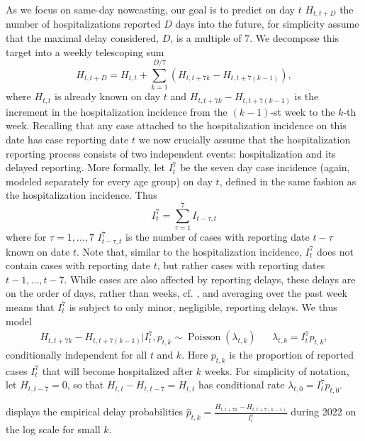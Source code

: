 As we focus on same-day nowcasting, our goal is to predict on day $t$ $H^{}_{t, t + D}$ the number of hospitalizations reported $D$ days into the future, for simplicity assume that the maximal delay considered, $D$, is a multiple of $7$. We decompose this target into a weekly telescoping sum 
$$
    H^{}_{t, t + D} = H^{}_{t, t} + \sum_{k = 1} ^{D / 7} (H^{}_{t, t + 7k} - H_{t, t + 7 ( k - 1)}),
$$
where $H_{t,t}$ is already known on day $t$ and $H_{t, t + 7k} - H_{t, t + 7 ( k - 1)}$ is the increment in the hospitalization incidence from the $(k-1)$-st week to the $k$-th week. Recalling that any case attached to the hospitalization incidence on this date has case reporting date $t$ we now crucially assume that the hospitalization reporting process consists of two independent events: hospitalization and its delayed reporting.
More formally, let $I^{7}_{t}$ be the seven day case incidence (again, modeled separately for every age group) on day $t$, defined in the same fashion as the hospitalization incidence. Thus 
$$
    I^{7}_t = \sum_{\tau = 1}^{7} I^{}_{t - \tau, t}
$$
where for $\tau = 1, \dots, 7$ $I^{7}_{t - \tau, t}$ is the number of cases with reporting date $t - \tau$ known on date $t$. Note that, similar to the hospitalization incidence, $I^{7}_t$ does not contain cases with reporting date $t$, but rather cases with reporting dates $t - 1, \dots, t - 7$. While cases are also affected by reporting delays, these delays are on the order of days, rather than weeks, cf. , and averaging over the past week means that $I^{7}_t$ is subject to only minor, negligible, reporting delays. We thus model 
\begin{align}
    \label{eq:hosp_increment_distribution}
    H_{t, t + 7k} - H^{}_{t, t + 7 ( k - 1)} | I^{7}_t, p^{}_{t,k} \sim \operatorname{Poisson} \left( \lambda^{}_{t,k} \right) && \lambda^{}_{t,k} = I^{7}_{t} p^{}_{t,k},
\end{align}
conditionally independent for all $t$ and $k$.
Here $p^{}_{t,k}$ is the proportion of reported cases $I^{7}_{t}$ that will become hospitalized after $k$ weeks.
For simplicity of notation, let $H_{t, t - 7} = 0$, so that $H_{t,t} - H_{t, t- 7} = H_{t,t}$ has conditional rate $\lambda_{t,0} = I^{7}_t p_{t,0}$.

 displays the empirical delay probabilities $\hat p_{t,k} = \frac{H_{t, t + 7k} - H_{t,t + 7 (k - 1)}}{I^{7}_t}$ during 2022 on the log scale for small $k$. 

